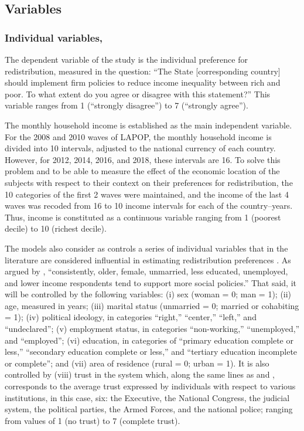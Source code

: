 \documentclass[utf8]{frontiersSCNS} %
\begin{document}
\subsection{Variables}

\subsubsection{Individual variables,}

The dependent variable of the study is the individual preference for redistribution, measured in the question: “The State [corresponding country] should implement firm policies to reduce income inequality between rich and poor. To what extent do you agree or disagree with this statement?” This variable ranges from 1 (“strongly disagree”) to 7 (“strongly agree”).

The monthly household income is established as the main independent variable. For the 2008 and 2010 waves of LAPOP, the monthly household income is divided into 10 intervals, adjusted to the national currency of each country. However, for 2012, 2014, 2016, and 2018, these intervals are 16. To solve this problem and to be able to measure the effect of the economic location of the subjects with respect to their context on their preferences for redistribution, the 10 categories of the first 2 waves were maintained, and the income of the last 4 waves was recoded from 16 to 10 income intervals for each of the country–years. Thus, income is constituted as a continuous variable ranging from 1 (poorest decile) to 10 (richest decile).

The models also consider as controls a series of individual variables that in the literature are considered influential in estimating redistribution preferences \parencite{CastilloRedistributiveConflictsPreferences2010}. As argued by \textcite[p.~21]{BradyDoesImmigrationUndermine2014}, “consistently, older, female, unmarried, less educated, unemployed, and lower income respondents tend to support more social policies.” That said, it will be controlled by the following variables: (i) sex (woman = 0; man = 1); (ii) age, measured in years; (iii) marital status (unmarried = 0; married or cohabiting = 1); (iv) political ideology, in categories “right,” “center,” “left,” and “undeclared”; (v) employment status, in categories “non-working,” “unemployed,” and “employed”; (vi) education, in categories of “primary education complete or less,” “secondary education complete or less,” and “tertiary education incomplete or complete”; and (vii) area of residence (rural = 0; urban = 1). It is also controlled by (viii) trust in the system which, along the same lines as \textcite{Brandtdisadvantagedlegitimizesocial2013} and \textcite{CichockaWhatInvertedCan2017}, corresponds to the average trust expressed by individuals with respect to various institutions, in this case, six: the Executive, the National Congress, the judicial system, the political parties, the Armed Forces, and the national police; ranging from values of 1 (no trust) to 7 (complete trust).
\end{document}
